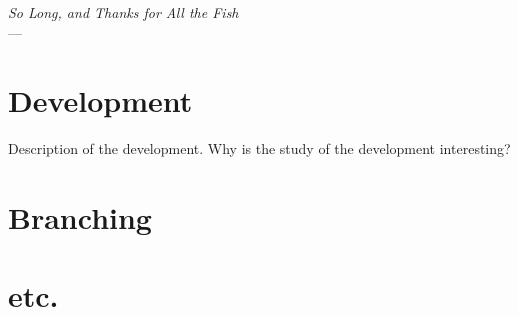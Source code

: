 \label{ch:lung}
\begin{flushright}{\slshape    
		So Long, and Thanks for All the Fish} \\ \medskip
    ---  \citep{Adams1984}
\end{flushright}
\bigskip

\section{Development}
Description of the development. Why is the study of the development interesting?

\section{Branching}

\section{etc.}